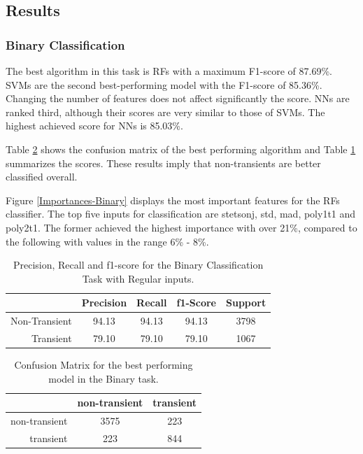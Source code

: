 \documentclass[a4paper,fleqn,usenatbib]{mnras}
\begin{document}
\subsection{Results}

\subsubsection{Binary Classification} 
\label{Results-Binary} 


The best algorithm in this task is RFs with a maximum F1-score of
87.69\%.   
SVMs are the second best-performing model with the F1-score of 85.36\%. 
Changing the number of features does not affect significantly the score.
NNs are ranked third, although their scores are very similar to those of SVMs. 
The highest achieved score for NNs is 85.03\%.


Table \ref{Confusion-Binary} shows the confusion matrix of the best
performing algorithm and Table \ref{Overall-Scores-Binary} summarizes
the scores.
These results imply that non-transients are better classified overall.  


Figure \ref{Importances-Binary} displays the most important features
for the RFs classifier.
The top five inputs for classification are stetson\textunderscore j,
std, mad, poly1\textunderscore t1 and poly2\textunderscore t1.  
The former achieved the highest importance with over 21\%, compared to
the following with values in the range 6\% - 8\%. 


\begin{table}
\centering
\begin{tabular}{|r|c|c|c|c|}
\hline
\multicolumn{1}{|l|}{} & Precision & Recall & f1-Score & Support \\ \hline \hline
Non-Transient          & 94.13     & 94.13      & 94.13      & 3798   \\ \hline
Transient              & 79.10     & 79.10      & 79.10      & 1067    \\ \hline
\end{tabular}
\caption{Precision, Recall and f1-score for the Binary Classification Task with Regular inputs.}
\label{Overall-Scores-Binary}
\end{table}

\begin{table}
\centering
\begin{tabular}{|r|c|c|}
\hline
\multicolumn{1}{|l|}{} & non-transient    & transient   \\ \hline \hline
non-transient                & 3575       & 223    \\ \hline
transient                    & 223       & 844   \\ \hline
\end{tabular}
\caption{Confusion Matrix for the best performing model in the Binary task.}
\label{Confusion-Binary}
\end{table}
\end{document}
